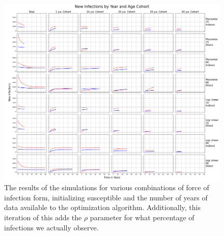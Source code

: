 \documentclass[10pt]{amsart}
\theoremstyle{nonumberplain}
\begin{document}
\begin{figure}[h]
	\centering
	\includegraphics[width=1.15\textwidth]{new_infections_by_year_and_age_cohort_with_rho.png}
 	\caption{The results of the simulations for various combinations of force of infection form, initializing susceptible and the number of years of data available to the optimization algorithm.
	Additionally, this iteration of this adds the $\rho$ parameter for what percentage of infections we actually observe.}\label{fig:f1}
\end{figure}
\end{document}
